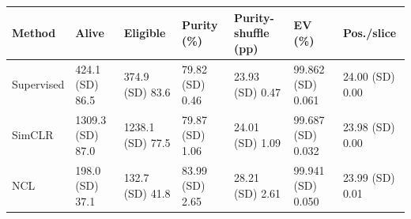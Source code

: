 \begin{tabular}{lllllll}
\toprule
Method & Alive & Eligible & Purity (\%) & Purity-shuffle (pp) & EV (\%) & Pos./slice \\
\midrule
Supervised & 424.1 (SD) 86.5 & 374.9 (SD) 83.6 & 79.82 (SD) 0.46 & 23.93 (SD) 0.47 & 99.862 (SD) 0.061 & 24.00 (SD) 0.00 \\
SimCLR & 1309.3 (SD) 87.0 & 1238.1 (SD) 77.5 & 79.87 (SD) 1.06 & 24.01 (SD) 1.09 & 99.687 (SD) 0.032 & 23.98 (SD) 0.00 \\
NCL & 198.0 (SD) 37.1 & 132.7 (SD) 41.8 & 83.99 (SD) 2.65 & 28.21 (SD) 2.61 & 99.941 (SD) 0.050 & 23.99 (SD) 0.01 \\
\bottomrule
\end{tabular}

